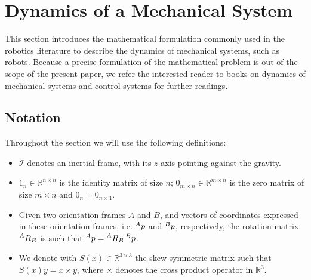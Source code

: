 \section{Dynamics of a Mechanical System}
\label{sec:background}

This section introduces the mathematical formulation commonly used in the robotics literature  to describe the dynamics of mechanical systems, such as robots.
Because a precise formulation of the mathematical problem is out of the scope of the present paper, we refer the interested reader to books on dynamics of mechanical systems \cite{Siciliano2009,Featherstone2007,Murray1994} and control systems \cite{Isidori1995,khalil2002} for further readings.

\subsection{Notation}
Throughout the section we will use the following definitions:
\begin{itemize}
    \item $\mathcal{I}$ denotes an inertial frame, with its $z$ axis pointing against the gravity. %
    \item $1_n \in \mathbb{R}^{n \times n}$ is the identity matrix of size $n$; $0_{m \times n} \in \mathbb{R}^{m \times n}$ is the zero matrix of size $m \times n$ and $0_{n } = 0_{n \times 1}$.
    \item Given two orientation frames $A$ and $B$, and vectors of coordinates expressed in these orientation frames, i.e. $\prescript{A}{}p$ and $\prescript{B}{}p$, respectively, the rotation matrix 
    $\prescript{A}{}R_B$ is such that $\prescript{A}{}p = \prescript{A}{}R_B  \prescript{B}{}p$. 
    \item We denote with $S(x) \in \mathbb{R}^{3 \times 3}$ the skew-symmetric matrix such that $S(x)y = x \times y$, where $\times$ denotes the cross product operator in $\mathbb{R}^3$. 
\end{itemize}

